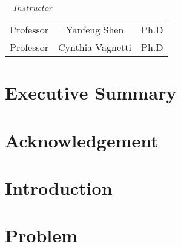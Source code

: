\documentclass{article}
\begin{document}
\normalsize
\vspace*{1em}
\begin{center}
\large
$\hspace{1em}Instructor$\\
\vspace*{1em}
\begin{tabular}{lcl}
\large
Professor\hspace{0.5em}\vspace{0.3em} &\hspace{0.5em}Yanfeng Shen\hspace{0.5em}&\hspace{0.5em}Ph.D\\ 
Professor\hspace{0.5em} &\hspace{0.5em}Cynthia Vagnetti \hspace{0.5em}&\hspace{0.5em}Ph.D\\ 
\end{tabular}
\end{center}


\newpage
\tableofcontents


\section{Executive Summary}


\section{Acknowledgement}


\section{Introduction}

\section{Problem}
\end{document}
